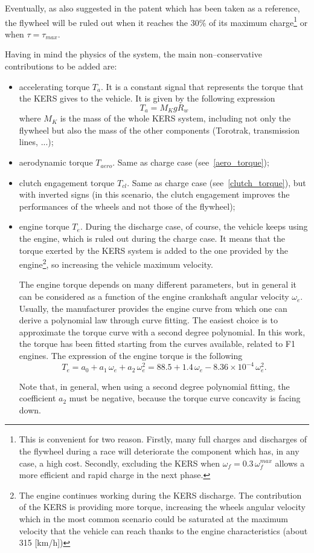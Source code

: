 \documentclass[11pt]{article}
\begin{document}
Eventually, as also suggested in the patent which has been taken as a reference, the flywheel will be ruled out when it reaches the 30\% of its maximum charge\footnote{This is convenient for two reason. Firstly, many full charges and discharges of the flywheel during a race will deteriorate the component which has, in any case, a high cost. Secondly, excluding the KERS when $\omega_f = 0.3\,\omega_f^{max}$ allows a more efficient and rapid charge in the next phase.} or when $\tau = \tau_{max}$.

Having in mind the physics of the system, the main non--conservative contributions to be added are:

\begin{itemize}
\item accelerating torque $T_a$. It is a constant signal that represents the torque that the KERS gives to the vehicle. It is given by the following expression
\begin{equation}
T_a = M_{K} g R_w
\label{accelerating_torque}
\end{equation}
where $M_K$ is the mass of the whole KERS system, including not only the flywheel but also the mass of the other components (Torotrak, transmission lines, ...);
\item aerodynamic torque $T_{aero}$. Same as charge case (see~\eqref{aero_torque});
\item clutch engagement torque $T_{cl}$. Same as charge case (see~\eqref{clutch_torque}), but with inverted signs (in this scenario, the clutch engagement improves the performances of the wheels and not those of the flywheel);
\item engine torque $T_e$. During the discharge case, of course, the vehicle keeps using the engine, which is ruled out during the charge case. It means that the torque exerted by the KERS system is added to the one provided by the engine\footnote{The engine continues working during the KERS discharge. The contribution of the KERS is providing more torque, increasing the wheels angular velocity which in the most common scenario could be saturated at the maximum velocity that the vehicle can reach thanks to the engine characteristics (about 315 [km/h])}, so increasing the vehicle maximum velocity. 

The engine torque depends on many different parameters, but in general it can be considered as a function of the engine crankshaft angular velocity $\omega_e$. Usually, the manufacturer provides the engine curve from which one can derive a polynomial law through curve fitting. The easiest choice is to approximate the torque curve with a second degree polynomial. In this work, the torque has been fitted starting from the curves available, related to F1 engines. The expression of the engine torque is the following
\begin{equation}
T_e = a_0 + a_1\,\omega_e + a_2 \, \omega_e^2 = 88.5 + 1.4 \,\omega_e -8.36 \times 10^{-4}\,\omega_e^2.
\label{engine_torque}
\end{equation}

Note that, in general, when using a second degree polynomial fitting, the coefficient $a_2$ must be negative, because the torque curve concavity is facing down.  
\end{itemize}
\end{document}
